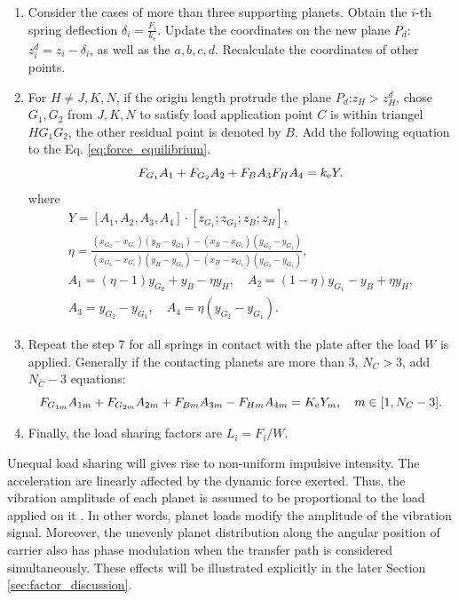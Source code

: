 \documentclass[a4paper,fleqn]{cas-sc}%
\begin{document}
\begin{enumerate}
    \item Consider the cases of more than three supporting planets. Obtain the $i$-th spring deflection $\delta_i=\frac{F_i}{k_e}$. Update the coordinates on the new plane $P_d$: $z^d_i=z_i-\delta_i$, as well as the $a,b,c,d$. Recalculate the coordinates of other points.
    \item For $H\neq J,K,N$, if the origin length protrude the plane $P_d$:$z_H>z^d_H$, chose $G_1,G_2$ from $J,K,N$ to satisfy load application point $C$ is within triangel $HG_1G_2$, the other residual point is denoted by $B$. Add the following equation to the Eq. \ref{eq:force_equilibrium}.
    \begin{equation}
        F_{G_1}A_1+F_{G_2}A_2+F_B A_3 F_H A_4=k_{\rm e}Y.
    \end{equation}
    where
    \begin{equation}
        \begin{split}
            Y=[A_1,A_2,A_3,A_4] \cdot [z_{G_1};z_{G_2};z_B;z_H],\\
            \eta=\frac{(x_{G_2}-x_{G_1})(y_B-y_{G1})-(x_B-x_{G_1})(y_{G_2}-y_{G_1})}{(x_{G_2}-x_{G_1})(y_H-y_{G_1})-(x_H-x_{G_1})(y_{G_2}-y_{G_1})},\\
            A_1=(\eta-1)y_{G_2}+y_B-\eta y_H,\quad A_2=(1-\eta)y_{G_1}-y_B+\eta y_H,\\
            A_3=y_{G_2}-y_{G_1},\quad A_4=\eta(y_{G_2}-y_{G_1}).
        \end{split}
    \end{equation}
    \item Repeat the step 7 for all springs in contact with the plate after the load $W$ is applied. Generally if the contacting planets are more than 3, $N_C>3$, add $N_C-3$ equations:
    \begin{equation}
        F_{G_{1m}}A_{1m}+F_{G_{2m}}A_{2m}+F_{Bm}A_{3m}-F_{Hm}A_{4m}=K_{\rm e}Y_m,\quad m\in[1,N_C-3].
    \end{equation}
    \item Finally, the load sharing factors are $L_i=F_i/W$.
\end{enumerate}
\par Unequal load sharing will gives rise to non-uniform impulsive intensity. The acceleration are linearly affected by the dynamic force exerted. Thus, the vibration amplitude of each planet is assumed to be proportional to the load applied on it \cite{Inalpolat2009}. In other words, planet loads modify the amplitude of the vibration signal. Moreover, the unevenly planet distribution along the angular position of carrier also has phase modulation when the transfer path is considered simultaneously. These effects will be illustrated explicitly in the later Section \ref{sec:factor_discussion}. 
\end{document}
